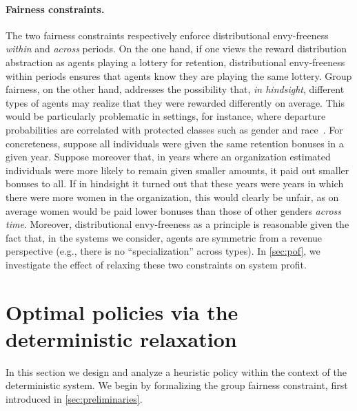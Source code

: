 \documentclass[12pt]{article}
\begin{document}
\paragraph{Fairness constraints.} 
The two fairness constraints respectively enforce distributional envy-freeness {\it within} and {\it across} periods. On the one hand, if one views the reward distribution abstraction as agents playing a lottery for retention, distributional envy-freeness within periods ensures that agents know they are playing the same lottery. Group fairness, on the other hand, addresses the possibility that, {\it in hindsight}, different types of agents may realize that they were rewarded differently on average. This would be particularly problematic in settings, for instance, where departure probabilities are correlated with protected classes such as gender and race~\cite{heckert2002gender}. {For concreteness, suppose all individuals were given the same retention bonuses in a given year. Suppose moreover that, in years where an organization estimated individuals were more likely to remain given smaller amounts, it paid out smaller bonuses to all. If in hindsight it turned out that these years were years in which there were more women in the organization, this would clearly be unfair, as on average women would be paid lower bonuses than those of other genders {\it across time}. Moreover, distributional envy-freeness as a principle is reasonable given the fact that, in the systems we consider, agents are symmetric from a revenue perspective (e.g., there is no ``specialization'' across types). In \cref{sec:pof}, we investigate the effect of relaxing these two constraints on system profit.
}

\section{Optimal policies via the deterministic relaxation}\label{sec:main-results}


{In this section we design and analyze a heuristic policy within the context of the deterministic system.  We begin by formalizing the group fairness constraint, first introduced in \cref{sec:preliminaries}.



}
\end{document}
